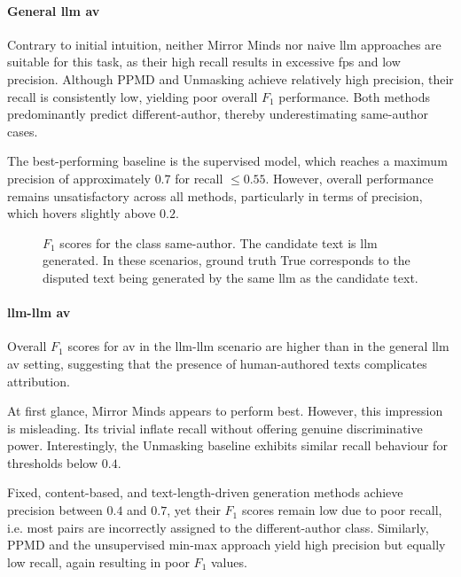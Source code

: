 \paragraph{General \ac{llm} \ac{av}}

Contrary to initial intuition, neither Mirror Minds nor naive \ac{llm} approaches are suitable for this task, as their high recall results in excessive \acp{fp} and low precision.  
Although PPMD and Unmasking achieve relatively high precision, their recall is consistently low, yielding poor overall $F_1$ performance.  
Both methods predominantly predict different-author, thereby underestimating same-author cases.  

The best-performing baseline is the supervised model, which reaches a maximum precision of approximately $0.7$ for recall $\leq 0.55$.  
However, overall performance remains unsatisfactory across all methods, particularly in terms of precision, which hovers slightly above $0.2$.


\begin{figure}[h]
  \centering
  
  \caption{$F_1$ scores for the class same-author. 
The candidate text is \ac{llm} generated.
In these scenarios, ground truth True corresponds to the disputed text being generated by the same \ac{llm} as the candidate text.
}
  \label{fig:llm_av_prec}
\end{figure}



\paragraph{\ac{llm}-\ac{llm} \ac{av}}

Overall $F_1$ scores for \ac{av} in the \ac{llm}-\ac{llm} scenario are higher than in the general \ac{llm} \ac{av} setting, suggesting that the presence of human-authored texts complicates attribution.  

At first glance, Mirror Minds appears to perform best. 
However, this impression is misleading.  
Its trivial \imps{} inflate recall without offering genuine discriminative power.  
Interestingly, the Unmasking baseline exhibits similar recall behaviour for thresholds below $0.4$.  

Fixed, content-based, and text-length-driven \imp{} generation methods achieve precision between $0.4$ and $0.7$, yet their $F_1$ scores remain low due to poor recall, i.e. most pairs are incorrectly assigned to the different-author class.  
Similarly, PPMD and the unsupervised min-max approach yield high precision but equally low recall, again resulting in poor $F_1$ values.  

